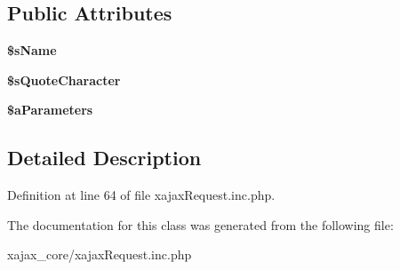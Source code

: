 \subsection*{Public Attributes}
\begin{DoxyCompactItemize}
\item 
\hypertarget{classxajaxRequest_a5397f48675795fc160488d225c58f79f}{
{\bfseries \$sName}}
\label{classxajaxRequest_a5397f48675795fc160488d225c58f79f}

\item 
\hypertarget{classxajaxRequest_ab00fdd43e764e20f2aa45a8594bac3b9}{
{\bfseries \$sQuoteCharacter}}
\label{classxajaxRequest_ab00fdd43e764e20f2aa45a8594bac3b9}

\item 
\hypertarget{classxajaxRequest_a932442bfd23912fd94268794dfb51cc3}{
{\bfseries \$aParameters}}
\label{classxajaxRequest_a932442bfd23912fd94268794dfb51cc3}

\end{DoxyCompactItemize}


\subsection{Detailed Description}


Definition at line 64 of file xajaxRequest.inc.php.



The documentation for this class was generated from the following file:\begin{DoxyCompactItemize}
\item 
xajax\_\-core/xajaxRequest.inc.php\end{DoxyCompactItemize}
